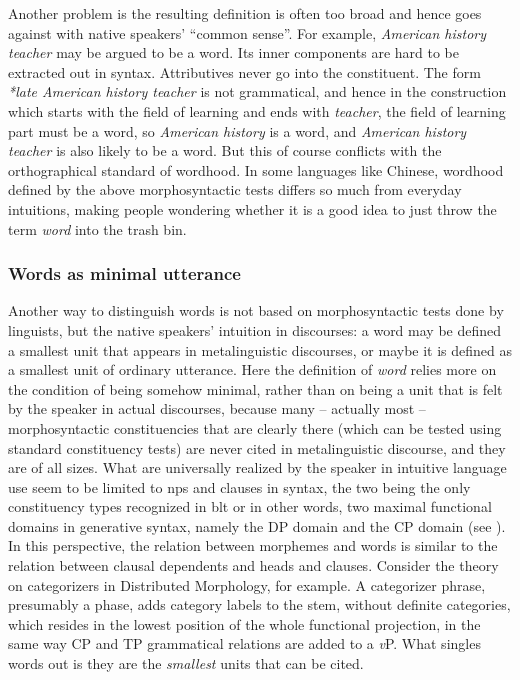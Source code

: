 \documentclass[UTF8, a4paper, oneside, scheme=plain]{ctexart}
\newcommand*{\term}[1]{\emph{#1}}
\newcommand*{\corpus}[1]{\emph{#1}}
\newcommand*{\vP}{\textit{v}P}
\begin{document}
Another problem is the resulting definition is often too broad and hence
goes against with native speakers' ``common sense''.
For example, \corpus{American history teacher} may be argued to be a word.
Its inner components are hard to be extracted out in syntax.
Attributives never go into the constituent.
The form \corpus{*late American history teacher} is not grammatical,
and hence in the construction which starts with the field of learning and ends with \corpus{teacher},
the field of learning part must be a word,
so \corpus{American history} is a word,
and \corpus{American history teacher} is also likely to be a word.
But this of course conflicts with the orthographical standard of wordhood.
In some languages like Chinese, 
wordhood defined by the above morphosyntactic tests 
differs so much from everyday intuitions,
making people wondering whether it is a good idea to just throw the term \term{word} into the trash bin.

\subsubsection{Words as minimal utterance}\label{sec:word-minimal-utterance}

Another way to distinguish words is not based on morphosyntactic tests done by linguists,
but the native speakers' intuition in discourses:
a word may be defined a smallest unit that appears in metalinguistic discourses,
or maybe it is defined as a smallest unit of ordinary utterance.
Here the definition of \term{word} relies more on the condition of being somehow minimal,
rather than on being a unit that is felt by the speaker in actual discourses,
because many -- actually most -- morphosyntactic constituencies that are clearly there 
(which can be tested using standard constituency tests)
are never cited in metalinguistic discourse,
and they are of all sizes.
What are universally realized by the speaker in intuitive language use 
seem to be limited to \ac{np}s and clauses in syntax,
the two being the only constituency types recognized in \ac{blt}
or in other words, two maximal functional domains in generative syntax,
namely the DP domain and the CP domain (see ).
In this perspective, the relation between morphemes and words 
is similar to the relation between clausal dependents and heads and clauses.
Consider the theory on categorizers in Distributed Morphology, for example.
A categorizer phrase,
presumably a phase, 
adds category labels to the stem,
without definite categories, which resides in the lowest position of the whole functional projection,
in the same way CP and TP grammatical relations are added to a \vP.
What singles words out is they are the \emph{smallest} units that can be cited.
\end{document}
